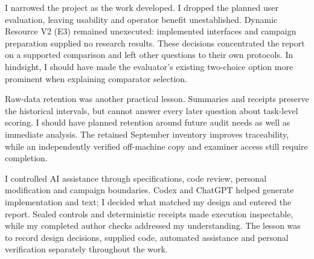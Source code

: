 \documentclass[12pt,a4paper]{article}
\begin{document}
I narrowed the project as the work developed. I dropped the planned user evaluation, leaving usability and operator benefit unestablished. Dynamic Resource V2 (E3) remained unexecuted: implemented interfaces and campaign preparation supplied no research results. These decisions concentrated the report on a supported comparison and left other questions to their own protocols. In hindsight, I should have made the evaluator's existing two-choice option more prominent when explaining comparator selection.

Raw-data retention was another practical lesson. Summaries and receipts preserve the historical intervals, but cannot answer every later question about task-level scoring. I should have planned retention around future audit needs as well as immediate analysis. The retained September inventory improves traceability, while an independently verified off-machine copy and examiner access still require completion.

I controlled AI assistance through specifications, code review, personal modification and campaign boundaries. Codex and ChatGPT helped generate implementation and text; I decided what matched my design and entered the report. Sealed controls and deterministic receipts made execution inspectable, while my completed author checks addressed my understanding. The lesson was to record design decisions, supplied code, automated assistance and personal verification separately throughout the work.
\end{document}
